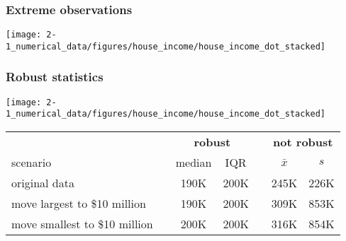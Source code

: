 
\begin{frame}
\frametitle{Extreme observations}


\begin{center}
\texttt{[image: 2-1\_numerical\_data/figures/house\_income/house\_income\_dot\_stacked]}
\end{center}

\end{frame}


\begin{frame}
\frametitle{Robust statistics}

\begin{center}
\texttt{[image: 2-1\_numerical\_data/figures/house\_income/house\_income\_dot\_stacked]}
\end{center}

{\small
\begin{center}
\begin{tabular}{l c cc c cc}
  \hline
& \hspace{0mm} & \multicolumn{2}{c}{\bf robust} & \hspace{2mm} & \multicolumn{2}{c}{\bf not robust} \\
scenario && median & IQR && $\bar{x}$ & $s$ \\ 
  \hline
original data && 190K & 200K && 245K & 226K \\ 
move largest to \$10 million && 190K & 200K && 309K & 853K \\ 
move smallest to \$10 million && 200K & 200K && 316K & 854K \\ 
   \hline
\end{tabular}
\end{center}
}

\end{frame}


